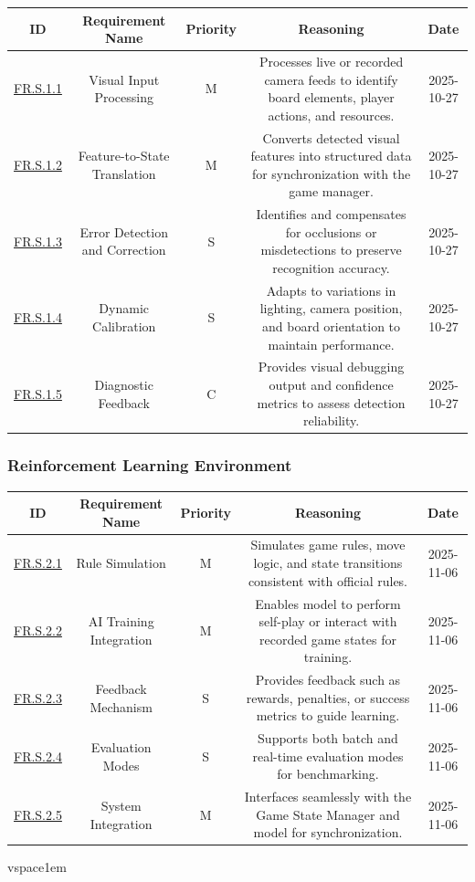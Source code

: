 \documentclass{article}
\begin{document}
\begin{tabular}{|c|c|c|c|c|}
\hline
\textbf{ID} & \textbf{Requirement Name} & \textbf{Priority} &
\textbf{Reasoning} & \textbf{Date} \\
\hline
\hyperref[FR.S.1.1]{FR.S.1.1} & Visual Input Processing & M &
\parbox[t]{4cm}{Processes live or recorded camera feeds to identify board elements, player actions, and resources.} &
2025-10-27 \\
\hline
\hyperref[FR.S.1.2]{FR.S.1.2} & Feature-to-State Translation & M &
\parbox[t]{4cm}{Converts detected visual features into structured \GameState{} data for synchronization with the game manager.} &
2025-10-27 \\
\hline
\hyperref[FR.S.1.3]{FR.S.1.3} & Error Detection and Correction & S &
\parbox[t]{4cm}{Identifies and compensates for occlusions or misdetections to preserve recognition accuracy.} &
2025-10-27 \\
\hline
\hyperref[FR.S.1.4]{FR.S.1.4} & Dynamic Calibration & S &
\parbox[t]{4cm}{Adapts to variations in lighting, camera position, and board orientation to maintain performance.} &
2025-10-27 \\
\hline
\hyperref[FR.S.1.5]{FR.S.1.5} & Diagnostic Feedback & C &
\parbox[t]{4cm}{Provides visual debugging output and confidence metrics to assess detection reliability.} &
2025-10-27 \\
\hline
\end{tabular}

\vspace{1em}

\subsubsection*{Reinforcement Learning Environment}

\begin{tabular}{|c|c|c|c|c|}
\hline
\textbf{ID} & \textbf{Requirement Name} & \textbf{Priority} &
\textbf{Reasoning} & \textbf{Date} \\
\hline
\hyperref[FR.S.2.1]{FR.S.2.1} & Rule Simulation & M &
\parbox[t]{4cm}{Simulates game rules, move logic, and state transitions consistent with official \emph{\Catan{}} rules.} &
2025-11-06 \\
\hline
\hyperref[FR.S.2.2]{FR.S.2.2} & AI Training Integration & M &
\parbox[t]{4cm}{Enables \AI{} model to perform self-play or interact with recorded game states for training.} &
2025-11-06 \\
\hline
\hyperref[FR.S.2.3]{FR.S.2.3} & Feedback Mechanism & S &
\parbox[t]{4cm}{Provides feedback such as rewards, penalties, or success metrics to guide learning.} &
2025-11-06 \\
\hline
\hyperref[FR.S.2.4]{FR.S.2.4} & Evaluation Modes & S &
\parbox[t]{4cm}{Supports both batch and real-time evaluation modes for \AI{} benchmarking.} &
2025-11-06 \\
\hline
\hyperref[FR.S.2.5]{FR.S.2.5} & System Integration & M &
\parbox[t]{4cm}{Interfaces seamlessly with the Game State Manager and \AI{} model for synchronization.} &
2025-11-06 \\
\hline
\end{tabular}
vspace{1em}
\end{document}
